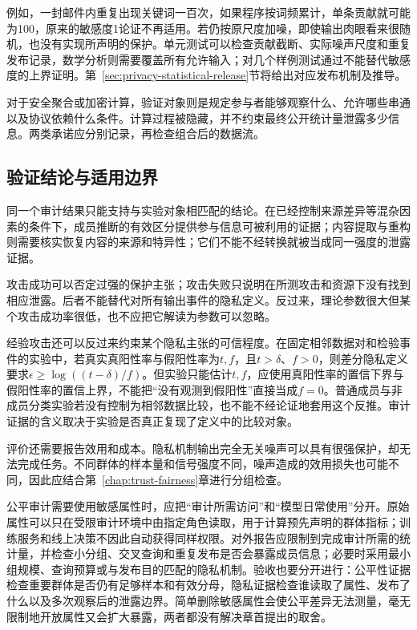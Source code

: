 例如，一封邮件内重复出现关键词一百次，如果程序按词频累计，单条贡献就可能为100，原来的敏感度1论证不再适用。若仍按原尺度加噪，即使输出肉眼看来很随机，也没有实现所声明的保护。单元测试可以检查贡献截断、实际噪声尺度和重复发布记录，数学分析则需要覆盖所有允许输入；对几个样例测试通过不能替代敏感度的上界证明。第~\ref{sec:privacy-statistical-release}节将给出对应发布机制及推导。

对于安全聚合或加密计算，验证对象则是规定参与者能够观察什么、允许哪些串通以及协议依赖什么条件。计算过程被隐藏，并不约束最终公开统计量泄露多少信息。两类承诺应分别记录，再检查组合后的数据流。

\subsection{验证结论与适用边界}
\label{sec:privacy-verification-evidence}

同一个审计结果只能支持与实验对象相匹配的结论。在已经控制来源差异等混杂因素的条件下，成员推断的有效区分提供参与信息可被利用的证据；内容提取与重构则需要核实恢复内容的来源和特异性；它们不能不经转换就被当成同一强度的泄露证据。

攻击成功可以否定过强的保护主张；攻击失败只说明在所测攻击和资源下没有找到相应泄露。后者不能替代对所有输出事件的隐私定义。反过来，理论参数很大但某个攻击成功率很低，也不应把它解读为参数可以忽略。

经验攻击还可以反过来约束某个隐私主张的可信程度。在固定相邻数据对和检验事件的实验中，若真实真阳性率与假阳性率为$t,f$，且$t>\delta$、$f>0$，则差分隐私定义要求$\epsilon\geq\log((t-\delta)/f)$。但实验只能估计$t,f$，应使用真阳性率的置信下界与假阳性率的置信上界，不能把“没有观测到假阳性”直接当成$f=0$。普通成员与非成员分类实验若没有控制为相邻数据比较，也不能不经论证地套用这个反推。审计证据的含义取决于实验是否真正复现了定义中的比较对象。

评价还需要报告效用和成本。隐私机制输出完全无关噪声可以具有很强保护，却无法完成任务。不同群体的样本量和信号强度不同，噪声造成的效用损失也可能不同，因此应结合第~\ref{chap:trust-fairness}章进行分组检查。

公平审计需要使用敏感属性时，应把“审计所需访问”和“模型日常使用”分开。原始属性可以只在受限审计环境中由指定角色读取，用于计算预先声明的群体指标；训练服务和线上决策不因此自动获得同样权限。对外报告应限制到完成审计所需的统计量，并检查小分组、交叉查询和重复发布是否会暴露成员信息；必要时采用最小组规模、查询预算或与发布目的匹配的隐私机制。验收也要分开进行：公平性证据检查重要群体是否仍有足够样本和有效分母，隐私证据检查谁读取了属性、发布了什么以及多次观察后的泄露边界。简单删除敏感属性会使公平差异无法测量，毫无限制地开放属性又会扩大暴露，两者都没有解决章首提出的取舍。

